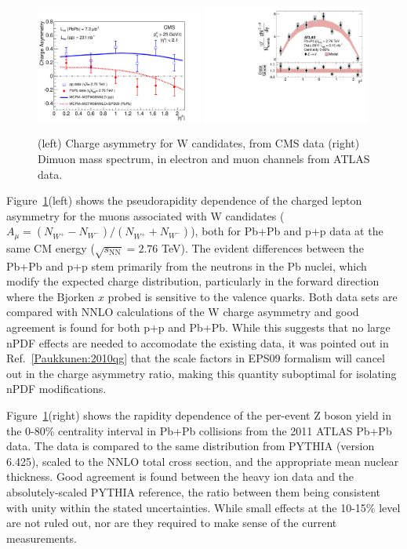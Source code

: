 \begin{figure}[!htb]
\begin{center}
\includegraphics[width=0.49\textwidth]{electroweak_figs/Fig3.pdf}
\includegraphics[width=0.49\textwidth]{electroweak_figs/fig_02.pdf}
\caption[]{(left) Charge asymmetry for W candidates, from CMS data (right) Dimuon mass spectrum, in electron and muon channels from ATLAS data.}
\label{fig:pas:zw_eta}
\end{center}
\end{figure}
Figure~\ref{fig:pas:zw_eta}(left) shows the pseudorapidity dependence of the charged lepton asymmetry for the muons associated with 
W candidates ($A_\mu = (N_{W^+}-N_{W^-})/(N_{W^+}+N_{W^-})$), both for Pb+Pb and p+p data at the same CM energy
($\sqrt{s_\mathrm{NN}}=2.76$ TeV).  The evident differences between the Pb+Pb and p+p stem primarily from the neutrons in the
Pb nuclei, which modify the expected charge distribution, particularly in the forward direction where the Bjorken $x$ probed
is sensitive to the valence quarks.
Both data sets are compared with NNLO calculations of the W charge asymmetry and good agreement is found for both p+p and Pb+Pb.
While this suggests that no large nPDF effects are needed to accomodate the existing data, it was pointed out in Ref.~\ref{Paukkunen:2010qg}
that the scale factors in EPS09 formalism will cancel out in the charge asymmetry ratio, making this quantity suboptimal for 
isolating nPDF modifications.

Figure~\ref{fig:pas:zw_eta}(right) shows the rapidity dependence of the per-event 
Z boson yield in the 0-80\% centrality interval in Pb+Pb collisions
from the 2011 ATLAS Pb+Pb data.
The data is compared to the same distribution from PYTHIA (version 6.425), scaled to the NNLO total cross section, 
and the appropriate mean nuclear thickness.
Good agreement is found between the heavy ion data and the absolutely-scaled PYTHIA reference, the ratio between them being consistent 
with unity within the stated uncertainties.  While small effects at the 10-15\% level are not ruled out, nor are they required to 
make sense of the current measurements.

